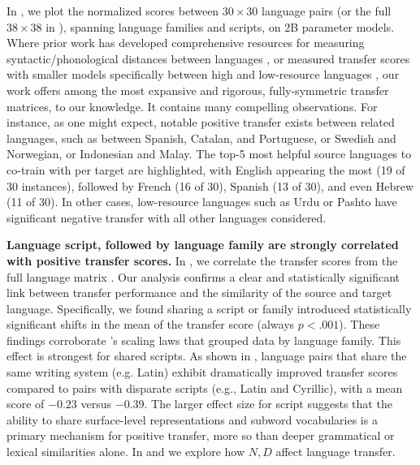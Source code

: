 In , we plot the normalized \btsabb{} scores between $30 \times 30$ language pairs (or the full $38 \times 38$ in ), spanning language families and scripts, on 2B parameter models.
Where prior work has developed comprehensive resources for measuring syntactic/phonological distances between languages \citep{khan2025uriel+}, or measured transfer scores with smaller models specifically between high and low-resource languages \citep{protasov2024super}, our work offers among the most expansive and rigorous, fully-symmetric transfer matrices, to our knowledge. 
It contains many compelling observations.
For instance, as one might expect, notable positive transfer exists between related languages, such as between Spanish, Catalan, and Portuguese, or Swedish and Norwegian, or Indonesian and Malay.
The top-5 most helpful source languages to co-train with per target are highlighted, with English appearing the most (19 of 30 instances), followed by French (16 of 30), Spanish (13 of 30), and even Hebrew (11 of 30).
In other cases, low-resource languages such as Urdu or Pashto have significant negative transfer with all other languages considered. 

\textbf{Language script, followed by language family are strongly correlated with positive transfer scores.}
In , we correlate the transfer scores from the full language matrix . 
Our analysis confirms a clear and statistically significant link between transfer performance and the similarity of the source and target language.
Specifically, we found sharing a script or family introduced statistically significant shifts in the mean of the transfer score (always $p<.001$).
These findings corroborate \citep{he2024scaling}'s scaling laws that grouped data by language family.
This effect is strongest for shared scripts. 
As shown in , language pairs that share the same writing system (e.g. Latin) exhibit dramatically improved transfer scores compared to pairs with disparate scripts (e.g., Latin and Cyrillic), with a mean score of $-0.23$ versus $-0.39$. 
The larger effect size for script suggests that the ability to share surface-level representations and subword vocabularies is a primary mechanism for positive transfer, more so than deeper grammatical or lexical similarities alone.
In  and  we explore how $N,D$ affect language transfer.

